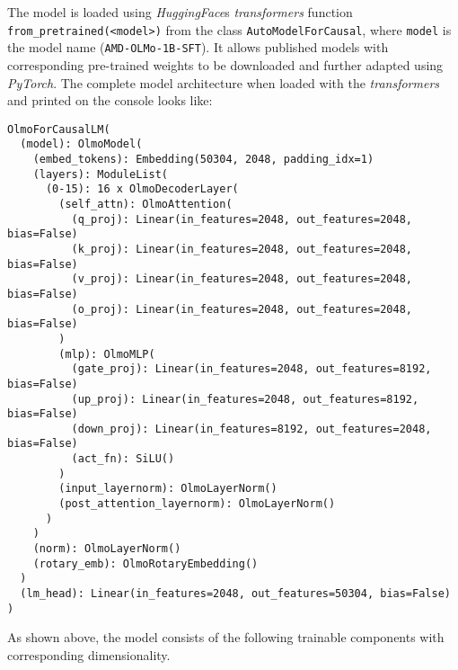 The model is loaded using \emph{HuggingFace}\textquotesingle s \emph{transformers} function \texttt{from\_pretrained(\textless model\textgreater)} from the class \texttt{AutoModelForCausal}, where \texttt{model} is the model name (\texttt{AMD-OLMo-1B-SFT}). It allows published models with corresponding pre-trained weights to be downloaded and further adapted using \emph{PyTorch}. The complete model architecture when loaded with the \emph{transformers} and printed on the console looks like:
\begin{verbatim}
OlmoForCausalLM(
  (model): OlmoModel(
    (embed_tokens): Embedding(50304, 2048, padding_idx=1)
    (layers): ModuleList(
      (0-15): 16 x OlmoDecoderLayer(
        (self_attn): OlmoAttention(
          (q_proj): Linear(in_features=2048, out_features=2048, bias=False)
          (k_proj): Linear(in_features=2048, out_features=2048, bias=False)
          (v_proj): Linear(in_features=2048, out_features=2048, bias=False)
          (o_proj): Linear(in_features=2048, out_features=2048, bias=False)
        )
        (mlp): OlmoMLP(
          (gate_proj): Linear(in_features=2048, out_features=8192, bias=False)
          (up_proj): Linear(in_features=2048, out_features=8192, bias=False)
          (down_proj): Linear(in_features=8192, out_features=2048, bias=False)
          (act_fn): SiLU()
        )
        (input_layernorm): OlmoLayerNorm()
        (post_attention_layernorm): OlmoLayerNorm()
      )
    )
    (norm): OlmoLayerNorm()
    (rotary_emb): OlmoRotaryEmbedding()
  )
  (lm_head): Linear(in_features=2048, out_features=50304, bias=False)
)
\end{verbatim}
As shown above, the model consists of the following trainable components with corresponding dimensionality.
